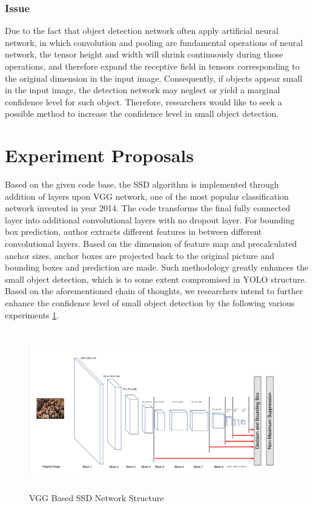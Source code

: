 \documentclass{article}
\begin{document}
\subsubsection{Issue}

Due to the fact that object detection network often apply artificial neural network, in which convolution and pooling are fundamental operations of neural network, the tensor height and width will shrink continuously during those operations, and therefore expand the receptive field in tensors corresponding to the original dimension in the input image. Consequently, if objects appear small in the input image, the detection network may neglect or yield a marginal confidence level for such object. Therefore, researchers would like to seek a possible method to increase the confidence level in small object detection. 

\section{Experiment Proposals}

Based on the given code base, the SSD algorithm is implemented through addition of layers upon VGG network, one of the most popular classification network invented in year 2014. The code transforms the final fully connected layer into additional convolutional layers with no dropout layer. For bounding box prediction, author extracts different features in between different convolutional layers. Based on the dimension of feature map and precalculated anchor sizes, anchor boxes are projected back to the original picture and bounding boxes and prediction are made. Such methodology greatly enhances the small object detection, which is to some extent compromised in YOLO structure. Based on the aforementioned chain of thoughts, we researchers intend to further enhance the confidence level of small object detection by the following various experiments \ref{F1}.

\begin{figure}
	\centering
	\includegraphics[height=7cm]{VGGSSDOriginal.png}
	\caption{VGG Based SSD Network Structure}	
	\label{F1}
	\end{figure}
\end{document}
